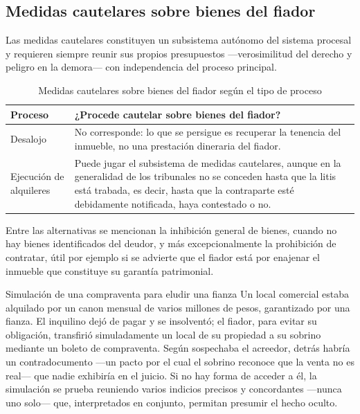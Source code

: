 \documentclass[12pt,oneside]{book}
\begin{document}
\subsection{Medidas cautelares sobre bienes del fiador}

Las medidas cautelares constituyen un subsistema autónomo del sistema procesal y requieren siempre reunir sus propios presupuestos ---verosimilitud del derecho y peligro en la demora--- con independencia del proceso principal.

\begin{table}[H]
\centering
\caption{Medidas cautelares sobre bienes del fiador según el tipo de proceso}
\begin{tabularx}{\textwidth}{>{\raggedright\arraybackslash}p{} X}
\toprule
\textbf{Proceso} & \textbf{¿Procede cautelar sobre bienes del fiador?} \\
\midrule
Desalojo & No corresponde: lo que se persigue es recuperar la tenencia del inmueble, no una prestación dineraria del fiador. \\
Ejecución de alquileres & Puede jugar el subsistema de medidas cautelares, aunque en la generalidad de los tribunales no se conceden hasta que la litis está trabada, es decir, hasta que la contraparte esté debidamente notificada, haya contestado o no. \\
\bottomrule
\end{tabularx}
\end{table}

Entre las alternativas se mencionan la inhibición general de bienes, cuando no hay bienes identificados del deudor, y más excepcionalmente la prohibición de contratar, útil por ejemplo si se advierte que el fiador está por enajenar el inmueble que constituye su garantía patrimonial.

\begin{example}{Simulación de una compraventa para eludir una fianza}
Un local comercial estaba alquilado por un canon mensual de varios millones de pesos, garantizado por una fianza. El inquilino dejó de pagar y se insolventó; el fiador, para evitar su obligación, transfirió simuladamente un local de su propiedad a su sobrino mediante un boleto de compraventa. Según sospechaba el acreedor, detrás habría un contradocumento ---un pacto por el cual el sobrino reconoce que la venta no es real--- que nadie exhibiría en el juicio. Si no hay forma de acceder a él, la simulación se prueba reuniendo varios indicios precisos y concordantes ---nunca uno solo--- que, interpretados en conjunto, permitan presumir el hecho oculto.
\end{example}
\end{document}
